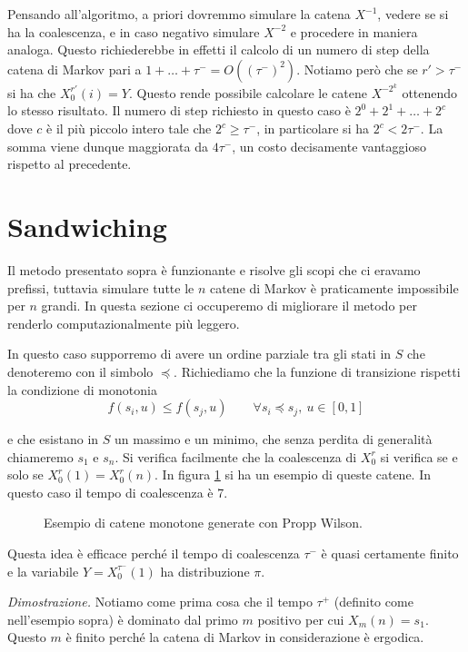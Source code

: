 \documentclass[]{marticle}
\begin{document}
Pensando all'algoritmo, a priori dovremmo simulare la catena $X^{-1}$, vedere se
si ha la coalescenza, e in caso negativo simulare $X^{-2}$ e procedere in
maniera analoga. Questo richiederebbe in effetti il calcolo di un numero di step
della catena di Markov pari a $1+\dots+\tau^- = O((\tau^-)^2)$. Notiamo per\`o
che se $r'>\tau^-$ si ha che $X^{r'}_0(i) = Y$. Questo rende possibile calcolare
le catene $X^{-2^k}$ ottenendo lo stesso risultato. Il numero di step richiesto
in questo caso \`e $2^0+2^1 + \dots + 2^c$ dove $c$ \`e il pi\`u piccolo intero
tale che $2^c \geq \tau^-$, in particolare si ha $2^c < 2\tau^-$. La somma viene
dunque maggiorata da $4\tau^-$, un costo decisamente vantaggioso rispetto al
precedente.

\section{Sandwiching}

Il metodo presentato sopra \`e funzionante e risolve gli scopi che ci eravamo
prefissi, tuttavia simulare tutte le $n$ catene di Markov \`e praticamente
impossibile per $n$ grandi. In questa sezione ci occuperemo di migliorare il
metodo per renderlo computazionalmente pi\`u leggero.
 
In questo caso supporremo di avere un ordine parziale tra gli stati in $S$ che
denoteremo con il simbolo $\preceq$. Richiediamo che la funzione di transizione
rispetti la condizione di monotonia
\[
    f(s_i, u) \leq f(s_j, u) \qquad \forall s_i \preceq s_j,\ u \in [0,1]
\]

e che esistano in $S$ un massimo e un minimo, che senza perdita di generalit\`a
chiameremo $s_1$ e $s_n$. Si verifica facilmente che la coalescenza di $X^r_0$
si verifica se e solo se $X^r_0(1) = X^r_0(n)$. In figura \ref{fig:im2} si ha un
esempio di queste catene. In questo caso il tempo di coalescenza \`e 7.

\begin{figure}[h!]

\caption{Esempio di catene monotone generate con Propp Wilson.}
\label{fig:im2}
\centering
\end{figure}

Questa idea \`e efficace perch\'e il tempo di coalescenza $\tau^-$ \`e quasi
certamente finito e la variabile $Y=X^{\tau^-}_0(1)$ ha distribuzione $\pi$.

\textit{Dimostrazione.} Notiamo come prima cosa che il tempo $\tau^+$ (definito
come nell'esempio sopra) \`e dominato dal primo $m$ positivo per cui $X_m(n) =
s_1$. Questo $m$ \`e finito perch\'e la catena di Markov in considerazione \`e
ergodica. 
\end{document}
